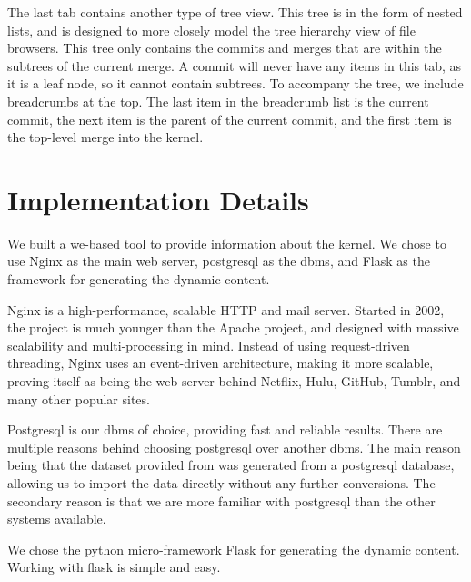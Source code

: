 \documentclass[conference, draftclsnofoot]{IEEEtran}
\begin{document}
The last tab contains another type of tree view. This tree is in the form of
nested lists, and is designed to more closely model the tree hierarchy view of
file browsers. This tree only contains the commits and merges that are within
the subtrees of the current merge. A commit will never have any items in this
tab, as it is a leaf node, so it cannot contain subtrees. To accompany the
tree, we include breadcrumbs at the top. The last item in the breadcrumb list
is the current commit, the next item is the parent of the current commit, and
the first item is the top-level merge into the kernel.



\section{Implementation Details}

We built a we-based tool to provide information about the kernel.
We chose to use Nginx as the main web server, postgresql as the dbms, and Flask
as the framework for generating the dynamic content.

Nginx is a high-performance, scalable HTTP and mail server. Started in 2002,
the project is much younger than the Apache project, and designed with massive
scalability and multi-processing in mind. Instead of using request-driven
threading, Nginx uses an event-driven architecture, making it more scalable,
proving itself as being the web server behind Netflix, Hulu, GitHub, Tumblr,
and many other popular sites.

Postgresql is our dbms of choice, providing fast and reliable results. There
are multiple reasons behind choosing postgresql over another dbms. The main
reason being that the dataset provided from  was generated from
a postgresql database, allowing us to import the data directly without any
further conversions. The secondary reason is that we are more familiar with
postgresql than the other systems available.

We chose the python micro-framework Flask for generating the dynamic content.
Working with flask is simple and easy.
\end{document}
